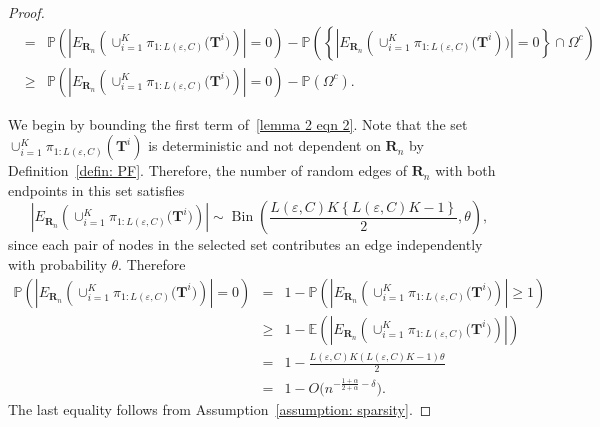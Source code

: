 \documentclass[twoside,11pt]{article}
\theoremstyle{remark}
\begin{document}
\begin{proof}
\begin{eqnarray}
\nonumber
&=& \mathbb{P}\left(\left|E_{\boldsymbol{R}_n}\left(\cup_{i=1}^K \pi_{1:L\left(\varepsilon,C\right)}\bigl(\boldsymbol{T}^i\bigr)\right)\right|=0\right)-\mathbb{P}\left(\left\{\left|E_{\boldsymbol{R}_n}\left(\cup_{i=1}^K \pi_{1:L\left(\varepsilon,C\right)}\bigl(\boldsymbol{T}^i\right)\bigr)\right|=0\right\}\cap \Omega^c\right)\\
&\geq & \mathbb{P}\left(\left|E_{\boldsymbol{R}_n}\left(\cup_{i=1}^K \pi_{1:L\left(\varepsilon,C\right)}\bigl(\boldsymbol{T}^i\bigr)\right)\right|=0\right)-\mathbb{P}\left(\Omega^c\right).
\end{eqnarray}
%

We begin by bounding the first term of~\eqref{lemma 2 eqn 2}. Note that the set $\cup_{i=1}^K \pi_{1:L\left(\varepsilon,C\right)}\left(\boldsymbol{T}^i\right)$
is deterministic and not dependent on $\boldsymbol{R}_n$ by Definition~\ref{defin: PF}. Therefore, the number of random edges of $\boldsymbol{R}_n$ with both endpoints in this set satisfies
%
\begin{equation*}
    \left| E_{\boldsymbol{R}_n} \left( \cup_{i=1}^K \pi_{1:L\left(\varepsilon,C\right)}\bigl(\boldsymbol{T}^i\bigr) \right) \right|
\sim \operatorname{Bin} \left( \frac{L(\varepsilon,C)K \left\{ L(\varepsilon,C)K - 1 \right\}}{2}, \theta \right),
\end{equation*}
%
since each pair of nodes in the selected set contributes an edge independently with probability $\theta$. Therefore
%
\begin{eqnarray}
\label{lemma 2 eqn 3}
\nonumber
\mathbb{P}\left(\left|E_{\boldsymbol{R}_n}\left(\cup_{i=1}^K \pi_{1:L\left(\varepsilon,C\right)}\bigl(\boldsymbol{T}^i\bigr)\right)\right|=0\right)&=& 1- \mathbb{P}\left(\left|E_{\boldsymbol{R}_n}\left(\cup_{i=1}^K \pi_{1:L\left(\varepsilon,C\right)}\bigl(\boldsymbol{T}^i\bigr)\right)\right|\ge 1\right)\\
\nonumber
&\geq & 1- \mathbb{E}\left(\left|E_{\boldsymbol{R}_n}\left(\cup_{i=1}^K \pi_{1:L\left(\varepsilon,C\right)}\bigl(\boldsymbol{T}^i\bigr)\right)\right|\right)\\
\nonumber
&=& 1- \frac{L(\varepsilon,C)K\left(L(\varepsilon,C)K-1\right)\theta}{2}\\
&=&1- O\bigl(n^{-\frac{1+\alpha}{2+\alpha}-\delta}\bigr).
\end{eqnarray}
%
The last equality follows from Assumption~\ref{assumption: sparsity}.


\end{proof}
\end{document}
